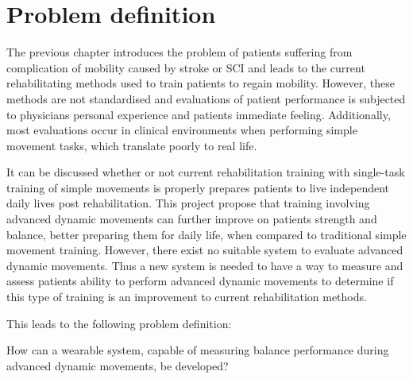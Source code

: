 \section{Problem definition}

The previous chapter introduces the problem of patients suffering from complication of mobility caused by stroke or SCI and leads to the current rehabilitating methods used to train patients to regain mobility. 
However, these methods are not standardised and evaluations of patient performance is subjected to physicians personal experience and patients immediate feeling. Additionally, most evaluations occur in clinical environments when performing simple movement tasks, which translate poorly to real life. 

It can be discussed whether or not current rehabilitation training with single-task training of simple movements is properly prepares patients to live independent daily lives post rehabilitation. This project propose that training involving advanced dynamic movements can further improve on patients strength and balance, better preparing them for daily life, when compared to traditional simple movement training. 
However, there exist no suitable system to evaluate advanced dynamic movements. Thus a new system is needed to have a way to measure and assess patients ability to perform advanced dynamic movements to determine if this type of training is an improvement to current rehabilitation methods.

This leads to the following problem definition:


\begin{center}
How can a wearable system, capable of measuring balance performance during advanced dynamic movements, be developed?
\end{center}

